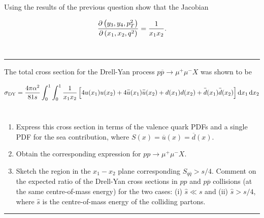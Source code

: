 \begin{problem}{10.7}
Using the results of the previous question show that the Jacobian

    \begin{align*}
        \frac{\partial \left( y_3,y_4,p_T^2 \right)}{\partial \left( x_1, x_2, q^2 \right)} = \frac{1}{x_1x_2}.
    \end{align*}\\
\end{problem}
\begin{solution}

\end{solution}

\noindent\rule{7in}{1.5pt}


\begin{problem}{10.8}
The total cross section for the Drell-Yan process $p\overbar{p}\to \mu^+\mu^-X$ was shown to be

\begin{align*}
    \sigma_\text{DY} = \frac{4\pi \alpha^2}{81s} \int_0^1 \int_0^1 \frac{1}{x_1x_2} \left[ 4u(x_1)u(x_2) + 4 \overbar{u}(x_1)\overbar{u}(x_2) + d(x_1) d(x_2) + \overbar{d}(x_1)\overbar{d}(x_2)  \right] \dif x_1 \dif x_2
\end{align*}\\
\begin{enumerate}[label=(\alph*)]
    \item Express this cross section in terms of the valence quark PDFs and a single PDF for the sea contribution, where $S(x)=\overbar{u}(x) = \overbar{d}(x)$.
    \item Obtain the corresponding expression for $pp\to\mu^+\mu^-X$.
    \item Sketch the region in the $ x_1-x_2$ plane corresponding $S_{q\overbar{q}}>s/4$. Comment on the expected ratio of the Drell-Yan cross sections in $pp$ and $p\overbar{p}$ collisions (at the same centre-of-mass energy) for the two cases: (i) $\hat{s} \ll s$ and (ii) $\hat{s} > s/4$, where $\hat{s}$ is the centre-of-mass energy of the colliding partons.
\end{enumerate}
\end{problem}
\begin{solution}

\end{solution}

\noindent\rule{7in}{1.5pt}

